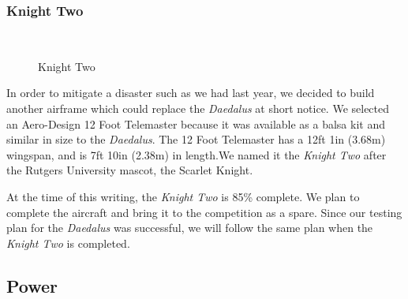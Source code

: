 \documentclass[pdftex,10pt,letter]{article}
\begin{document}
\subsubsection{Knight Two}
\begin{figure}
	\centering
\\
  	\label{fig:knighttwo}
  	\caption[Knight Two]{Knight Two}

\end{figure}

In order to mitigate a disaster such as we had last year, we decided to build another airframe which could replace the \emph{Daedalus} at short notice. We selected an Aero-Design 12 Foot Telemaster \cite{aerodesign} because it was available as a balsa kit and similar in size to the \emph{Daedalus}. The 12 Foot Telemaster has a 12ft 1in (3.68m) wingspan, and is 7ft 10in (2.38m) in length.We named it the \emph{Knight Two} after the Rutgers University mascot, the Scarlet Knight.

At the time of this writing, the \emph{Knight Two} is 85\% complete. We plan to complete the aircraft and bring it to the competition as a spare.  
Since our testing plan for the \emph{Daedalus} was successful, we will follow the same plan when the \emph{Knight Two} is completed.

\subsection{Power}
\end{document}
